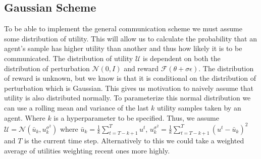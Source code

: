 

\subsection{Gaussian Scheme}
\label{sec:GaussianScheme}

To be able to implement the general communication scheme we must assume some distribution of utility. This will allow us to calculate the probability that an agent's sample has higher utility than another and thus how likely it is to be communicated. The distribution of utility $\mathcal{U}$ is dependent on both the distribution of perturbation $\mathcal{N}(0,I)$ and reward $\mathcal{F}(\theta +\sigma \epsilon)$. The distribution of reward is unknown, but we know is that it is conditional on the distribution of perturbation which is Gaussian. This gives us motivation to naively assume that utility is also distributed normally. To parameterize this normal distribution we can use a rolling mean and variance of the last $k$ utility samples taken by an agent. Where $k$ is a hyperparameter to be specified. Thus, we assume $\mathcal{U} = \mathcal{N}(\bar{u}_k, u^{\sigma^2}_k)$ where $\bar{u}_k = \frac{1}{k} \sum_{t=T-k+1}^T u^t$, $u^{\sigma^2}_k = \frac{1}{k}\sum_{t=T-k+1}^T (u^t - \bar{u}_k)^2$ and $T$ is the current time step. Alternatively to this we could take a weighted average of utilities weighting recent ones more highly.

